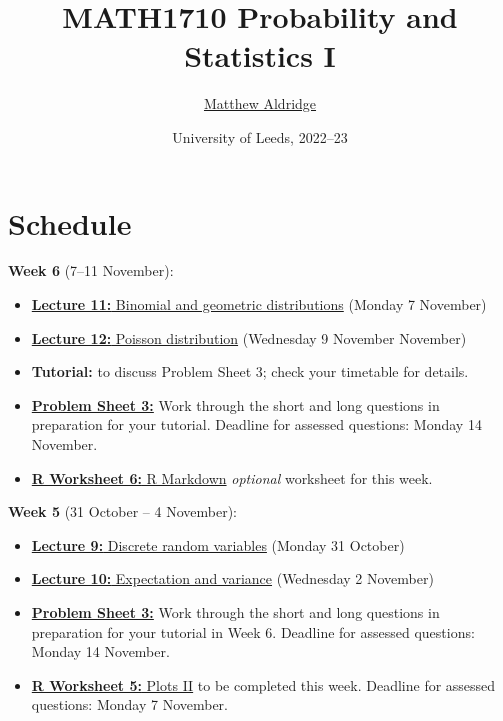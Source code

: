 \documentclass[
  a4paper,
]{book}
\title{MATH1710 Probability and Statistics I}
\author{\href{https://mpaldridge.github.io/math1710}{Matthew Aldridge}}
\date{University of Leeds, 2022--23}
\providecommand{\tightlist}{%
  \setlength{\itemsep}{0pt}\setlength{\parskip}{0pt}}
\theoremstyle{definition}
\theoremstyle{definition}
\theoremstyle{definition}
\theoremstyle{definition}
\theoremstyle{remark}
\begin{document}
\maketitle

{
\setcounter{tocdepth}{1}
\tableofcontents
}
\hypertarget{schedule}{%
\chapter*{Schedule}\label{schedule}}

\newcommand{\Var}{\operatorname{Var}}

\textbf{Week 6} (7--11 November):

\begin{itemize}
\tightlist
\item
  \protect\hyperlink{11-binomial-geometric}{\textbf{Lecture 11:} Binomial and geometric distributions} (Monday 7 November)
\item
  \protect\hyperlink{L12-poisson}{\textbf{Lecture 12:} Poisson distribution} (Wednesday 9 November November)
\item
  \textbf{Tutorial:} to discuss Problem Sheet 3; check your timetable for details.
\item
  \protect\hyperlink{P3}{\textbf{Problem Sheet 3:}} Work through the short and long questions in preparation for your tutorial. Deadline for assessed questions: Monday 14 November.
\item
  \protect\hyperlink{r-work}{\textbf{R Worksheet 6:} R Markdown} \emph{optional} worksheet for this week.
\end{itemize}

\textbf{Week 5} (31 October -- 4 November):

\begin{itemize}
\tightlist
\item
  \protect\hyperlink{L09-discrete-rv}{\textbf{Lecture 9:} Discrete random variables} (Monday 31 October)
\item
  \protect\hyperlink{L10-expectation}{\textbf{Lecture 10:} Expectation and variance} (Wednesday 2 November)
\item
  \protect\hyperlink{P3}{\textbf{Problem Sheet 3:}} Work through the short and long questions in preparation for your tutorial in Week 6. Deadline for assessed questions: Monday 14 November.
\item
  \protect\hyperlink{r-work}{\textbf{R Worksheet 5:} Plots II} to be completed this week. Deadline for assessed questions: Monday 7 November.
\end{itemize}
\end{document}
